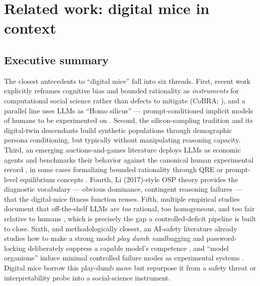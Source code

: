 %
%

\section*{Related work: digital mice in context}

\subsection*{Executive summary}

The closest antecedents to ``digital mice'' fall into six threads.
First, recent work explicitly reframes cognitive bias and bounded
rationality as \emph{instruments} for computational social science
rather than defects to mitigate (CoBRA; \citealp{cobra2025}), and a
parallel line uses LLMs as ``Homo silicus'' --- prompt-conditioned
implicit models of humans to be experimented on
\citep{horton2023silicus, manning2024automated}. Second, the
silicon-sampling tradition \citep{argyle2023silicon} and its
digital-twin descendants \citep{peng2025funhouse} build synthetic
populations through demographic persona conditioning, but typically
without manipulating reasoning capacity. Third, an emerging
auctions-and-games literature deploys LLMs as economic agents and
benchmarks their behavior against the canonical human experimental
record \citep{shah2025synthetic, zheng2025bounded, henning2025bubbles},
in some cases formalizing bounded rationality through QRE
\citep{pechon2026qre} or prompt-level equilibrium concepts
\citep{zhu2025llmnash}. Fourth, Li (2017)-style OSP theory
\citep{li2017osp, breitmoser2022obviousness} provides the diagnostic
vocabulary --- obvious dominance, contingent reasoning failures ---
that the digital-mice fitness function reuses. Fifth, multiple
empirical studies document that off-the-shelf LLMs are
\emph{too} rational, too homogeneous, and too fair relative to humans
\citep{henning2025bubbles, peng2025funhouse}, which is precisely the
gap a controlled-deficit pipeline is built to close. Sixth, and
methodologically closest, an AI-safety literature already studies how
to make a strong model \emph{play dumb}: sandbagging and
password-locking deliberately suppress a capable model's competence
\citep{vanderweij2024sandbagging, greenblatt2024password}, and
``model organisms'' induce minimal controlled failure modes as
experimental systems \citep{turner2025modelorganisms}. Digital mice
borrow this play-dumb move but repurpose it from a safety threat or
interpretability probe into a social-science instrument.

